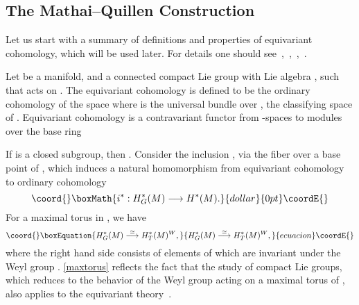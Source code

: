 \documentclass[a4paper,12pt,reqno,sumlimits]{amsart}
\theoremstyle{plain}
\theoremstyle{definition}
\providecommand{\1}{{\bf 1}}
\providecommand{\g}{{\mathfrak  g}}
\renewcommand{\to}{\longrightarrow}
\providecommand{\iso}{\stackrel{\simeq}{\longrightarrow}}
\providecommand{\inc}{\hookrightarrow}
\numberwithin{equation}{section}
\begin{document}
\subsection{The Mathai--Quillen Construction}
\label{mqfinitecase}

Let us start with a summary of definitions and properties of equivariant
cohomology, which will be used later. For details one should
see~\cite{ab},~\cite{bgv},~\cite{radu},~\cite{cordes}.

Let \coordHE{} be a manifold, and \coordHE{} a connected compact Lie group with Lie algebra
\myHighlight{$\g$}\coordHE{}, such that \coordHE{} acts on \coordHE{}. The equivariant cohomology \coordHE{} is
defined to be the ordinary cohomology \coordHE{} of the space \coordHE{} where \coordHE{} is the universal bundle over \coordHE{}, the classifying space of
\coordHE{}.  Equivariant cohomology is a contravariant functor from \coordHE{}-spaces to
modules over the base ring \coordHE{}

If \coordHE{} is a closed subgroup, then \coordHE{}.
Consider the inclusion \myHighlight{$i:M\inc M^G$}\coordHE{}, via the fiber over a base point of
\coordHE{}, which induces a natural homomorphism from equivariant cohomology to
ordinary cohomology
$$\coord{}\boxMath{
i^*:H^*_G(M)\to H^*(M).
}{dollar}{0pt}\coordE{}$$
For \coordHE{} a maximal torus in \coordHE{}, we have
\begin{equation}\coord{}\boxEquation{
  \label{maxtorus}
  H^*_G(M)\iso H^*_T(M)^W,
}{
  H^*_G(M)\iso H^*_T(M)^W,
}{ecuacion}\coordE{}\end{equation}
where the right hand side consists of elements of \coordHE{} which are
invariant under the Weyl group \coordHE{}.  \eqref{maxtorus} reflects the
fact that the study of compact Lie groups, which reduces to the behavior of
the Weyl group acting on a maximal torus of \coordHE{}, also applies to the
equivariant theory~\cite[p. 4]{ab}.
\end{document}
